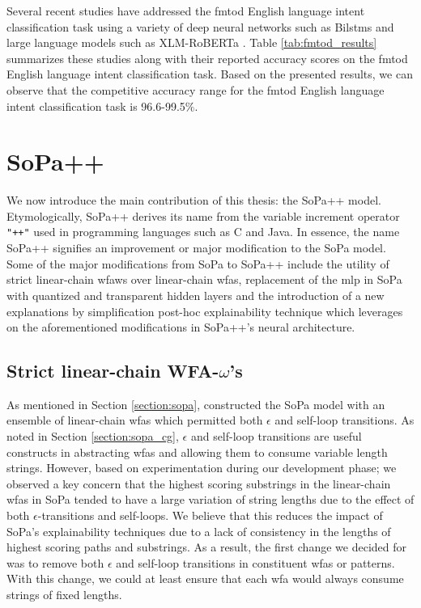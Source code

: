 \label{section:fmtod_performance}

Several recent studies have addressed the \ac{fmtod} English language intent
classification task using a variety of deep neural networks such as Bi\ac{lstm}s and
large language models such as XLM-RoBERTa
\citep{schuster-etal-2019-cross-lingual,zhang2019joint,zhang-etal-2020-intent}.
Table \ref{tab:fmtod_results} summarizes these studies along with their reported
accuracy scores on the \ac{fmtod} English language intent classification task. Based
on the presented results, we can observe that the competitive accuracy range for
the \ac{fmtod} English language intent classification task is 96.6-99.5$\%$.

\section{SoPa++}

We now introduce the main contribution of this thesis: the SoPa++ model.
Etymologically, SoPa++ derives its name from the variable increment operator
\texttt{"++"} used in programming languages such as C and Java. In essence, the
name SoPa++ signifies an improvement or major modification to the SoPa model.
Some of the major modifications from SoPa to SoPa++ include the utility of
strict linear-chain \ac{wfaws} over linear-chain \ac{wfas}, replacement of the
\ac{mlp} in SoPa with quantized and transparent hidden layers and the introduction of
a new explanations by simplification post-hoc explainability technique which
leverages on the aforementioned modifications in SoPa++'s neural architecture.

\subsection{Strict linear-chain WFA-$\omega$'s}

As mentioned in Section \ref{section:sopa}, \citet{schwartz2018sopa} constructed
the SoPa model with an ensemble of linear-chain \ac{wfas} which permitted both
$\epsilon$ and self-loop transitions. As noted in Section \ref{section:sopa_cg},
$\epsilon$ and self-loop transitions are useful constructs in abstracting \ac{wfas}
and allowing them to consume variable length strings. However, based on
experimentation during our development phase; we observed a key concern that the
highest scoring substrings in the linear-chain \ac{wfas} in SoPa tended to have a
large variation of string lengths due to the effect of both
$\epsilon$-transitions and self-loops. We believe that this reduces the impact
of SoPa's explainability techniques due to a lack of consistency in the lengths
of highest scoring paths and substrings. As a result, the first change we decided
for was to remove both $\epsilon$ and self-loop transitions in constituent \ac{wfas}
or patterns. With this change, we could at least ensure that each \ac{wfa} would
always consume strings of fixed lengths.

